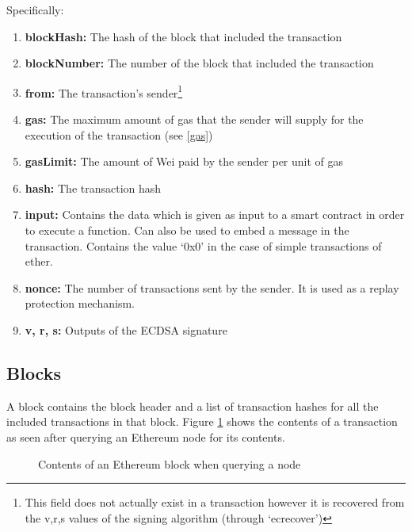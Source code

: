 Specifically:
\begin{enumerate}
    \item \textbf{blockHash:} The hash of the block that included the transaction
    \item \textbf{blockNumber:} The number of the block that included the transaction
    \item \textbf{from:} The transaction's sender\footnote{This field does not actually exist in a transaction however it is recovered from the v,r,s values of the signing algorithm (through `ecrecover')}
    \item \textbf{gas:} The maximum amount of gas that the sender will supply for the execution of the transaction (see \ref{gas})
    \item \textbf{gasLimit:} The amount of Wei paid by the sender per unit of gas
    \item \textbf{hash:} The transaction hash
    \item \textbf{input:} Contains the data which is given as input to a smart contract in order to execute a function. Can also be used to embed a message in the transaction. Contains the value `0x0' in the case of simple transactions of ether.
    \item \textbf{nonce:} The number of transactions sent by the sender. It is used as a replay protection mechanism.
    \item \textbf{v, r, s:} Outputs of the ECDSA signature
\end{enumerate}

\subsection{Blocks} \label{block}
A block contains the block header and a list of transaction hashes for all the included transactions in that block. Figure \ref{fig:block} shows the contents of a transaction as seen after querying an Ethereum node for its contents.
\begin{figure}[H]
    \centering
    
    \caption{Contents of an Ethereum block when querying a node}
    \label{fig:block}
\end{figure}

